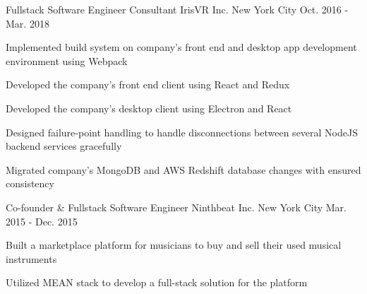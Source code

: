 \begin{cventries}
  \cventry
    {Fullstack Software Engineer Consultant} %
    {IrisVR Inc.} %
    {New York City} %
    {Oct. 2016 - Mar. 2018} %
    {
      \begin{cvitems} %
        \item {Implemented build system on company's front end and desktop app development environment using Webpack}
        \item {Developed the company's front end client using React and Redux}
        \item {Developed the company's desktop client using Electron and React}
        \item {Designed failure-point handling to handle disconnections between several NodeJS backend services gracefully}
        \item {Migrated company's MongoDB and AWS Redshift database changes with ensured consistency}
      \end{cvitems}
    }

  \cventry
    {Co-founder \& Fullstack Software Engineer} %
    {Ninthbeat Inc.} %
    {New York City} %
    {Mar. 2015 - Dec. 2015} %
    {
      \begin{cvitems} %
        \item {Built a marketplace platform for musicians to buy and sell their used musical instruments}
        \item {Utilized MEAN stack to develop a full-stack solution for the platform}
      \end{cvitems}
    }

\end{cventries}
